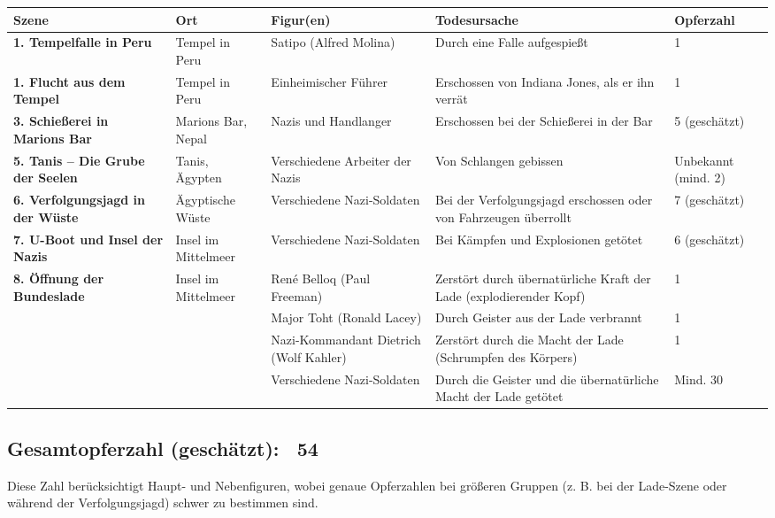 \documentclass[a4paper]{article}
\begin{document}
\begin{dialogue}
\begin{table}[h]
\centering
\small
\begin{tabu} to \linewidth { |X[m,c]|X[m,c]|X[m,c]|X[m,c]|X[m,c]| }

\hline
Szene & Ort & Figur(en) & Todesursache & Opferzahl\\\hline 
\hline
\textbf{1. Tempelfalle in Peru} & Tempel in Peru & Satipo (Alfred Molina) & Durch eine Falle aufgespießt & 1\\\hline 
\textbf{1. Flucht aus dem Tempel} & Tempel in Peru & Einheimischer Führer & Erschossen von Indiana Jones, als er ihn verrät & 1\\\hline 
\textbf{3. Schießerei in Marions Bar} & Marions Bar, Nepal & Nazis und Handlanger & Erschossen bei der Schießerei in der Bar & 5 (geschätzt)\\\hline 
\textbf{5. Tanis – Die Grube der Seelen} & Tanis, Ägypten & Verschiedene Arbeiter der Nazis & Von Schlangen gebissen & Unbekannt (mind. 2)\\\hline 
\textbf{6. Verfolgungsjagd in der Wüste} & Ägyptische Wüste & Verschiedene Nazi-Soldaten & Bei der Verfolgungsjagd erschossen oder von Fahrzeugen überrollt & 7 (geschätzt)\\\hline 
\textbf{7. U-Boot und Insel der Nazis} & Insel im Mittelmeer & Verschiedene Nazi-Soldaten & Bei Kämpfen und Explosionen getötet & 6 (geschätzt)\\\hline 
\textbf{8. Öffnung der Bundeslade} & Insel im Mittelmeer & René Belloq (Paul Freeman) & Zerstört durch übernatürliche Kraft der Lade (explodierender Kopf) & 1\\\hline 
 &  & Major Toht (Ronald Lacey) & Durch Geister aus der Lade verbrannt & 1\\\hline 
 &  & Nazi-Kommandant Dietrich (Wolf Kahler) & Zerstört durch die Macht der Lade (Schrumpfen des Körpers) & 1\\\hline 
 &  & Verschiedene Nazi-Soldaten & Durch die Geister und die übernatürliche Macht der Lade getötet & Mind. 30\\\hline 
\end{tabu}
\end{table}
\end{dialogue}
\subsection*{Gesamtopferzahl (geschätzt): ~54}
Diese Zahl berücksichtigt Haupt- und Nebenfiguren, wobei genaue Opferzahlen bei größeren Gruppen (z. B. bei der Lade-Szene oder während der Verfolgungsjagd) schwer zu bestimmen sind.
\end{document}
